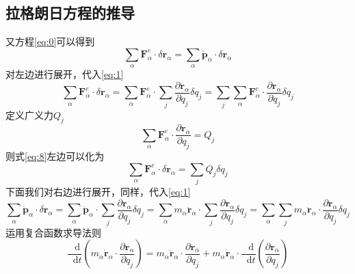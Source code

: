\documentclass{article}
\newcommand*{\dif}{\mathop{}\!\mathrm{d}}
\begin{document}
\subsection{拉格朗日方程的推导}
又方程\ref{eq:0}可以得到
\begin{equation}
  \label{eq:8}
  \sum\limits_{\alpha} \mathbf{F}_{\alpha}^{e} \cdot \delta \mathbf{r}_{\alpha} =  \sum\limits_{\alpha} \dot{\mathbf{p}}_{\alpha} \cdot \delta \mathbf{r}_{\alpha}
\end{equation}
对左边进行展开，代入\ref{eq:1}
\begin{equation}
  \label{eq:2}
  \sum\limits_{\alpha} \mathbf{F}_{\alpha}^{e} \cdot \delta \mathbf{r}_{\alpha} = \sum\limits_{\alpha} \mathbf{F}_{\alpha}^{e} \cdot  \sum\limits_{j} \frac{\partial \mathbf{r}_{\alpha}}{\partial q_{j}} \delta q_{j} = \sum\limits_{j} \sum\limits_{\alpha} \mathbf{F}_{\alpha}^{e} \cdot \frac{\partial \mathbf{r}_{\alpha}}{\partial q_{j}} \delta q_{j}
\end{equation}
定义广义力$Q_{j}$
\begin{equation}
  \label{eq:3}
  \sum\limits_{\alpha} \mathbf{F}_{\alpha}^{e} \cdot \frac{\partial \mathbf{r}_{\alpha}}{\partial q_{j}} = Q_{j}
\end{equation}
则式\ref{eq:8}左边可以化为
\begin{equation}
  \label{eq:11}
  \sum\limits_{\alpha} \mathbf{F}_{\alpha}^{e} \cdot \delta \mathbf{r}_{\alpha} = \sum\limits_{j} Q_{j} \delta q_{j}
\end{equation}
下面我们对右边进行展开，同样，代入\ref{eq:1}
\begin{equation}
  \label{eq:12}
  \sum\limits_{\alpha} \dot{\mathbf{p}}_{\alpha} \cdot \delta \mathbf{r}_{\alpha} = \sum\limits_{\alpha} \dot{\mathbf{p}}_{\alpha} \cdot \sum\limits_{j} \frac{\partial \mathbf{r}_{\alpha}}{\partial q_{j}} \delta q_{j} = \sum\limits_{\alpha}m_{\alpha} \ddot{\mathbf{r}}_{\alpha}  \cdot \sum\limits_{j} \frac{\partial \mathbf{r}_{\alpha}}{\partial q_{j}} \delta q_{j} =  \sum\limits_{\alpha} \sum\limits_{j} m_{\alpha} \ddot{\mathbf{r}}_{\alpha}  \cdot  \frac{\partial \mathbf{r}_{\alpha}}{\partial q_{j}} \delta q_{j}
\end{equation}
运用复合函数求导法则
\begin{equation}
  \label{eq:13}
  \frac{\dif}{\dif t} \left( m_{\alpha} \dot{\mathbf{r}}_{\alpha} \cdot \frac{\partial \mathbf{r}_{\alpha}}{\partial q_{j}} \right) = m_{\alpha} \ddot{\mathbf{r}}_{\alpha}  \cdot  \frac{\partial \mathbf{r}_{\alpha}}{\partial q_{j}} + m_{\alpha} \dot{\mathbf{r}}_{\alpha} \cdot \frac{\dif}{\dif t} \left(  \frac{\partial \mathbf{r}_{\alpha}}{\partial q_{j}}  \right)
\end{equation}
\end{document}
